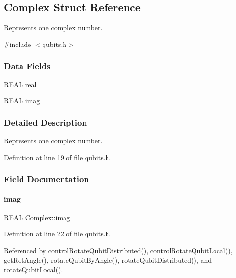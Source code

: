 \hypertarget{structComplex}{}\subsection{Complex Struct Reference}
\label{structComplex}


Represents one complex number.  




{\ttfamily \#include $<$qubits.\+h$>$}

\subsubsection*{Data Fields}
\begin{DoxyCompactItemize}
\item 
\hyperlink{precision_8h_a4b654506f18b8bfd61ad2a29a7e38c25}{R\+E\+AL} \hyperlink{structComplex_a479ad939835457595fcca3ca55c06283}{real}
\item 
\hyperlink{precision_8h_a4b654506f18b8bfd61ad2a29a7e38c25}{R\+E\+AL} \hyperlink{structComplex_a1151948284b21c0052f203f23ab931d9}{imag}
\end{DoxyCompactItemize}


\subsubsection{Detailed Description}
Represents one complex number. 

Definition at line 19 of file qubits.\+h.



\subsubsection{Field Documentation}
\mbox{\label{structComplex_a1151948284b21c0052f203f23ab931d9}} 
\paragraph{\texorpdfstring{imag}{imag}}
{\footnotesize\ttfamily \hyperlink{precision_8h_a4b654506f18b8bfd61ad2a29a7e38c25}{R\+E\+AL} Complex\+::imag}



Definition at line 22 of file qubits.\+h.



Referenced by control\+Rotate\+Qubit\+Distributed(), control\+Rotate\+Qubit\+Local(), get\+Rot\+Angle(), rotate\+Qubit\+By\+Angle(), rotate\+Qubit\+Distributed(), and rotate\+Qubit\+Local().

